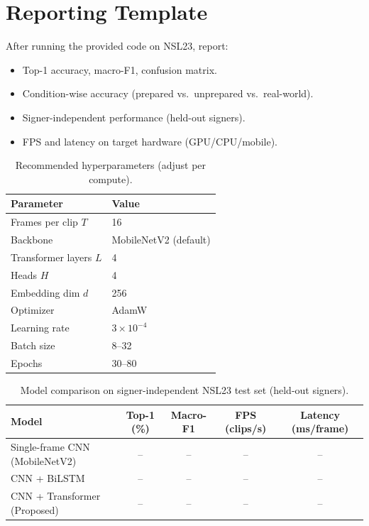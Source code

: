 \documentclass[conference]{IEEEtran}
\begin{document}
\section{Reporting Template}
After running the provided code on NSL23, report:
\begin{itemize}
\item Top-1 accuracy, macro-F1, confusion matrix.
\item Condition-wise accuracy (prepared vs.\ unprepared vs.\ real-world).
\item Signer-independent performance (held-out signers).
\item FPS and latency on target hardware (GPU/CPU/mobile).
\end{itemize}

\begin{table}[t]
\centering
\caption{Recommended hyperparameters (adjust per compute).}
\label{tab:hparams}
\begin{tabular}{ll}
\toprule
Parameter & Value \\
\midrule
Frames per clip $T$ & 16 \\
Backbone & MobileNetV2 (default) \\
Transformer layers $L$ & 4 \\
Heads $H$ & 4 \\
Embedding dim $d$ & 256 \\
Optimizer & AdamW \\
Learning rate & $3\times 10^{-4}$ \\
Batch size & 8--32 \\
Epochs & 30--80 \\
\bottomrule
\end{tabular}
\end{table}

\begin{table}[t]
\centering
\caption{Model comparison on signer-independent NSL23 test set (held-out signers).}
\label{tab:modelcomp}
\begin{tabular}{lcccc}
\toprule
Model & Top-1 (\%) & Macro-F1 & FPS (clips/s) & Latency (ms/frame) \\
\midrule
Single-frame CNN (MobileNetV2) & -- & -- & -- & -- \\
CNN + BiLSTM & -- & -- & -- & -- \\
CNN + Transformer (Proposed) & -- & -- & -- & -- \\
\bottomrule
\end{tabular}
\end{table}
\end{document}
